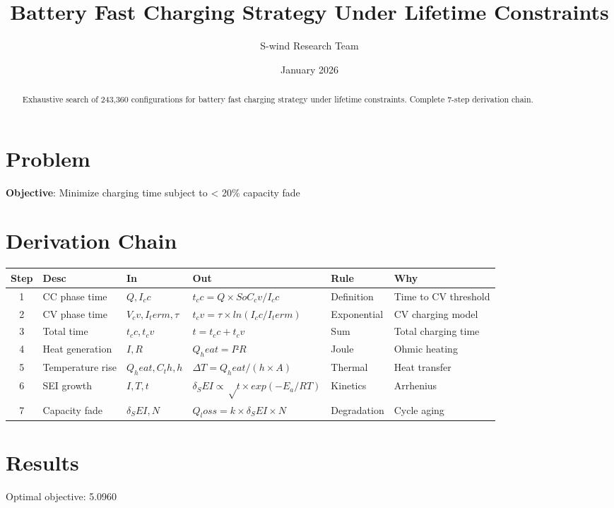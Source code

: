 \documentclass[11pt]{article}
\title{Battery Fast Charging Strategy Under Lifetime Constraints}
\author{S-wind Research Team}
\date{January 2026}
\begin{document}
\maketitle

\begin{abstract}
Exhaustive search of 243,360 configurations for battery fast charging strategy under lifetime constraints. Complete 7-step derivation chain.
\end{abstract}

\section{Problem}
\textbf{Objective}: Minimize charging time subject to < 20\% capacity fade

\section{Derivation Chain}
\begin{longtable}{|c|p{2cm}|p{2cm}|p{3cm}|p{2cm}|p{3cm}|}
\hline
Step & Desc & In & Out & Rule & Why\\\hline\endhead
1 & CC phase time & $Q, I_cc$ & $t_cc = Q×SoC_cv/I_cc$ & Definition & Time to CV threshold\\\hline
2 & CV phase time & $V_cv, I_term, τ$ & $t_cv = τ×ln(I_cc/I_term)$ & Exponential & CV charging model\\\hline
3 & Total time & $t_cc, t_cv$ & $t = t_cc + t_cv$ & Sum & Total charging time\\\hline
4 & Heat generation & $I, R$ & $Q_heat = I²R$ & Joule & Ohmic heating\\\hline
5 & Temperature rise & $Q_heat, C_th, h$ & $ΔT = Q_heat/(h×A)$ & Thermal & Heat transfer\\\hline
6 & SEI growth & $I, T, t$ & $δ_SEI ∝ √t × exp(-E_a/RT)$ & Kinetics & Arrhenius\\\hline
7 & Capacity fade & $δ_SEI, N$ & $Q_loss = k × δ_SEI × N$ & Degradation & Cycle aging\\\hline
\end{longtable}

\section{Results}
Optimal objective: 5.0960
\end{document}
